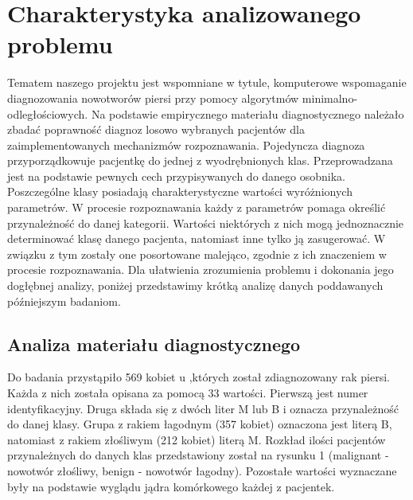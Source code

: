 \documentclass[12pt]{article}
\begin{document}
\section{Charakterystyka analizowanego problemu}
Tematem naszego projektu jest wspomniane w tytule, komputerowe wspomaganie diagnozowania nowotworów piersi przy pomocy algorytmów minimalno-odległościowych. Na podstawie empirycznego materiału diagnostycznego należało zbadać poprawność diagnoz losowo wybranych pacjentów dla zaimplementowanych mechanizmów rozpoznawania.
\newline
\indent Pojedyncza diagnoza przyporządkowuje pacjentkę do jednej z wyodrębnionych klas. Przeprowadzana jest na podstawie pewnych cech przypisywanych do danego osobnika. Poszczególne klasy posiadają charakterystyczne wartości wyróżnionych parametrów. W procesie rozpoznawania każdy z parametrów pomaga określić przynależność do danej kategorii. Wartości niektórych z nich mogą jednoznacznie determinować klasę danego pacjenta, natomiast inne tylko ją zasugerować. W związku z tym zostały one posortowane malejąco, zgodnie z ich znaczeniem w procesie rozpoznawania. 
\newline \indent Dla ułatwienia zrozumienia problemu i dokonania jego dogłębnej analizy, poniżej przedstawimy krótką analizę danych poddawanych późniejszym badaniom.


\subsection{Analiza materiału diagnostycznego}
\indent Do badania przystąpiło 569 kobiet u ,których został zdiagnozowany rak piersi. Każda z nich została opisana za pomocą 33 wartości. Pierwszą jest numer identyfikacyjny. Druga składa się z dwóch liter M lub B i oznacza przynależność do danej klasy.  Grupa z rakiem łagodnym (357 kobiet) oznaczona jest literą B, natomiast z rakiem złośliwym (212 kobiet) literą M. Rozkład ilości pacjentów przynależnych do danych klas przedstawiony został na rysunku 1 (malignant - nowotwór złośliwy, benign - nowotwór łagodny). Pozostałe wartości wyznaczane były na podstawie wyglądu jądra komórkowego każdej z pacjentek.
\newline
\end{document}
